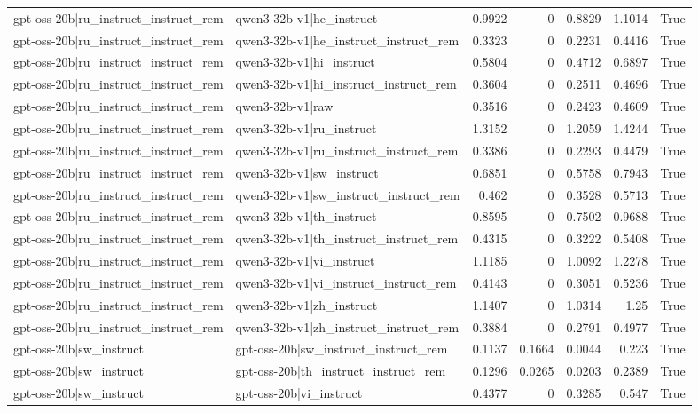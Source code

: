 \begin{table}
\begin{tabular}{l l r r r r l}
gpt-oss-20b|ru_instruct_instruct_rem & qwen3-32b-v1|he_instruct & 0.9922 & 0 & 0.8829 & 1.1014 & True \\
gpt-oss-20b|ru_instruct_instruct_rem & qwen3-32b-v1|he_instruct_instruct_rem & 0.3323 & 0 & 0.2231 & 0.4416 & True \\
gpt-oss-20b|ru_instruct_instruct_rem & qwen3-32b-v1|hi_instruct & 0.5804 & 0 & 0.4712 & 0.6897 & True \\
gpt-oss-20b|ru_instruct_instruct_rem & qwen3-32b-v1|hi_instruct_instruct_rem & 0.3604 & 0 & 0.2511 & 0.4696 & True \\
gpt-oss-20b|ru_instruct_instruct_rem & qwen3-32b-v1|raw & 0.3516 & 0 & 0.2423 & 0.4609 & True \\
gpt-oss-20b|ru_instruct_instruct_rem & qwen3-32b-v1|ru_instruct & 1.3152 & 0 & 1.2059 & 1.4244 & True \\
gpt-oss-20b|ru_instruct_instruct_rem & qwen3-32b-v1|ru_instruct_instruct_rem & 0.3386 & 0 & 0.2293 & 0.4479 & True \\
gpt-oss-20b|ru_instruct_instruct_rem & qwen3-32b-v1|sw_instruct & 0.6851 & 0 & 0.5758 & 0.7943 & True \\
gpt-oss-20b|ru_instruct_instruct_rem & qwen3-32b-v1|sw_instruct_instruct_rem & 0.462 & 0 & 0.3528 & 0.5713 & True \\
gpt-oss-20b|ru_instruct_instruct_rem & qwen3-32b-v1|th_instruct & 0.8595 & 0 & 0.7502 & 0.9688 & True \\
gpt-oss-20b|ru_instruct_instruct_rem & qwen3-32b-v1|th_instruct_instruct_rem & 0.4315 & 0 & 0.3222 & 0.5408 & True \\
gpt-oss-20b|ru_instruct_instruct_rem & qwen3-32b-v1|vi_instruct & 1.1185 & 0 & 1.0092 & 1.2278 & True \\
gpt-oss-20b|ru_instruct_instruct_rem & qwen3-32b-v1|vi_instruct_instruct_rem & 0.4143 & 0 & 0.3051 & 0.5236 & True \\
gpt-oss-20b|ru_instruct_instruct_rem & qwen3-32b-v1|zh_instruct & 1.1407 & 0 & 1.0314 & 1.25 & True \\
gpt-oss-20b|ru_instruct_instruct_rem & qwen3-32b-v1|zh_instruct_instruct_rem & 0.3884 & 0 & 0.2791 & 0.4977 & True \\
gpt-oss-20b|sw_instruct & gpt-oss-20b|sw_instruct_instruct_rem & 0.1137 & 0.1664 & 0.0044 & 0.223 & True \\
gpt-oss-20b|sw_instruct & gpt-oss-20b|th_instruct_instruct_rem & 0.1296 & 0.0265 & 0.0203 & 0.2389 & True \\
gpt-oss-20b|sw_instruct & gpt-oss-20b|vi_instruct & 0.4377 & 0 & 0.3285 & 0.547 & True \\

\end{tabular}
\end{table}
